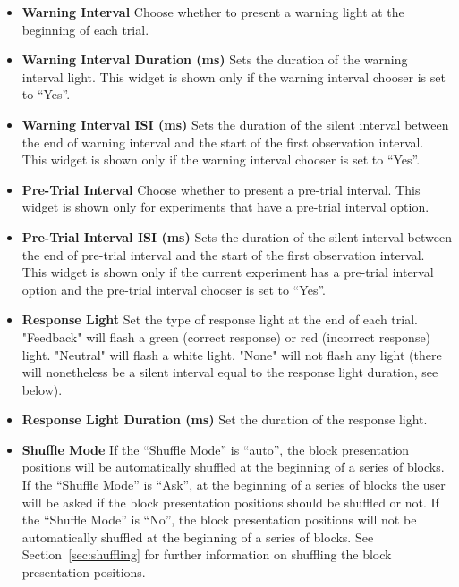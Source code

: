 \begin{itemize}
\item \textbf{Warning Interval} Choose whether to present a warning light at the beginning of each trial. 

\item \textbf{Warning Interval Duration (ms)} Sets the duration of the warning interval light.
  This widget is shown only if the warning interval chooser is set to ``Yes''.

\item \textbf{Warning Interval ISI (ms)} Sets the duration of the silent interval between the end of warning interval and the start of the first observation interval.
  This widget is shown only if the warning interval chooser is set to ``Yes''.

\item \textbf{Pre-Trial Interval} Choose whether to present a pre-trial interval. This widget is shown only for experiments that have a pre-trial interval option.

\item \textbf{Pre-Trial Interval ISI (ms)} Sets the duration of the silent interval between the end of pre-trial interval and the start of the first observation interval.
  This widget is shown only if the current experiment has a pre-trial interval option and the pre-trial interval chooser is set to ``Yes''.

\item \textbf{Response Light} Set the type of response light at the end of each trial. "Feedback" will
flash a green (correct response) or red (incorrect response) light. "Neutral" will flash a white light.
"None" will not flash any light (there will nonetheless be a silent interval equal to the response light duration, see below).

\item \textbf{Response Light Duration (ms)} Set the duration of the response light.
 
\item \textbf{Shuffle Mode} If the ``Shuffle Mode'' is ``auto'', the  block presentation positions 
will be automatically shuffled at the beginning of a series of blocks. If the ``Shuffle Mode'' 
is ``Ask'', at the beginning of a series of blocks the user will be asked if the block presentation
positions should be shuffled or not. If the ``Shuffle Mode'' is ``No'', the block presentation positions
will not be automatically shuffled at the beginning of a series of blocks. 
See Section~\ref{sec:shuffling} for further information on shuffling the block presentation positions.


\end{itemize}
